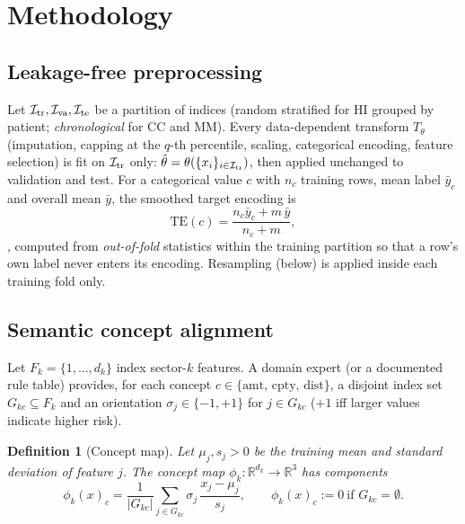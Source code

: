 \documentclass[journal]{IEEEtran}
\newtheorem{definition}{Definition}
\newcommand{\R}{\mathbb{R}}
\newcommand{\1}{\mathbf{1}}
\begin{document}
\section{Methodology}\label{sec:method}
\subsection{Leakage-free preprocessing}\label{sec:prep}
Let $\mathcal I_{\rm tr},\mathcal I_{\rm va},\mathcal I_{\rm te}$ be a partition of indices (random stratified for HI grouped by patient; \emph{chronological} for CC and MM). Every data-dependent transform $T_\theta$ (imputation, capping at the $q$-th percentile, scaling, categorical encoding, feature selection) is fit on $\mathcal I_{\rm tr}$ only: $\hat\theta=\theta(\{x_i\}_{i\in\mathcal I_{\rm tr}})$, then applied unchanged to validation and test. For a categorical value $c$ with $n_c$ training rows, mean label $\bar y_c$ and overall mean $\bar y$, the smoothed target encoding is
\begin{equation}
\mathrm{TE}(c)=\frac{n_c\bar y_c+m\,\bar y}{n_c+m},
\end{equation}
\cite{micci2001target}, computed from \emph{out-of-fold} statistics within the training partition so that a row's own label never enters its encoding. Resampling (below) is applied inside each training fold only.

\subsection{Semantic concept alignment}\label{sec:align}
Let $F_k=\{1,\dots,d_k\}$ index sector-$k$ features. A domain expert (or a documented rule table) provides, for each concept $c\in\{\text{amt, cpty, dist}\}$, a disjoint index set $G_{kc}\subseteq F_k$ and an orientation $\sigma_j\in\{-1,+1\}$ for $j\in G_{kc}$ ($+1$ iff larger values indicate higher risk).

\begin{definition}[Concept map]
Let $\mu_j,s_j>0$ be the training mean and standard deviation of feature $j$. The concept map $\phi_k:\R^{d_k}\to\R^3$ has components
\begin{equation}
\phi_k(x)_c=\frac1{|G_{kc}|}\sum_{j\in G_{kc}}\sigma_j\,\frac{x_j-\mu_j}{s_j},\qquad \phi_k(x)_c:=0\ \text{if }G_{kc}=\emptyset.
\label{eq:concept}
\end{equation}
\end{definition}
\end{document}
